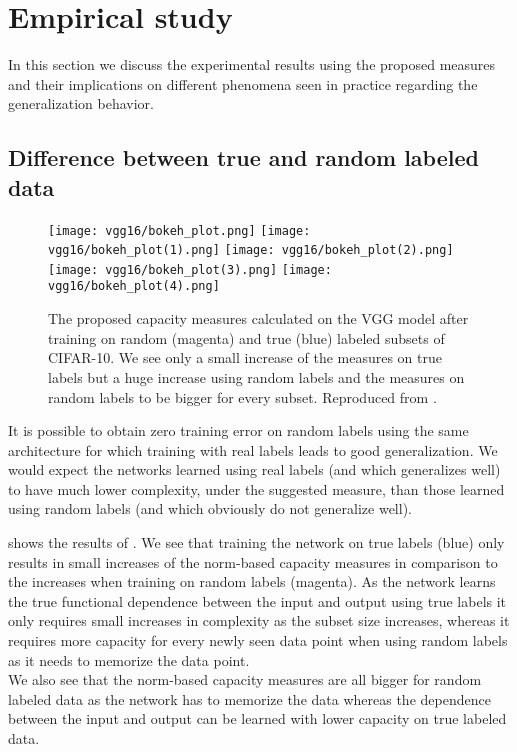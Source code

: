 \section{Empirical study}
In this section we discuss the experimental results using the proposed measures and their implications on different phenomena seen in practice regarding the generalization behavior.
%
\subsection{Difference between true and random labeled data}
\begin{figure}
	\centering
	\texttt{[image: vgg16/bokeh\_plot.png]}
	\texttt{[image: vgg16/bokeh\_plot(1).png]}
	\texttt{[image: vgg16/bokeh\_plot(2).png]}\\
	\texttt{[image: vgg16/bokeh\_plot(3).png]}
	\texttt{[image: vgg16/bokeh\_plot(4).png]}
	\caption{The proposed capacity measures calculated on the VGG model \cite{simonyan2014deep} after training on random (magenta) and true (blue) labeled subsets of CIFAR-10. We see only a small increase of the measures on true labels but a huge increase using random labels and the measures on random labels to be bigger for every subset. Reproduced from \cite{neyshabur2017exploring}.}	
	\label{fig:norms-paper}
\end{figure}
It is possible to obtain zero training error on random labels using the same architecture for which training with real labels leads to good generalization. We would expect the networks learned using real labels (and which generalizes well) to have much lower complexity, under the suggested measure, than those learned using random labels (and which obviously do not generalize well). \cite{neyshabur2017exploring} \par
%
 shows the results of \cite{neyshabur2017exploring}. We see that training the network on true labels (blue) only results in small increases of the norm-based capacity measures in comparison to the increases when training on random labels (magenta). As the network learns the true functional dependence between the input and output using true labels it only requires small increases in complexity as the subset size increases, whereas it requires more capacity for every newly seen data point when using random labels as it needs to memorize the data point.\\
We also see that the norm-based capacity measures are all bigger for random labeled data as the network has to memorize the data whereas the dependence between the input and output can be learned with lower capacity on true labeled data. \par
